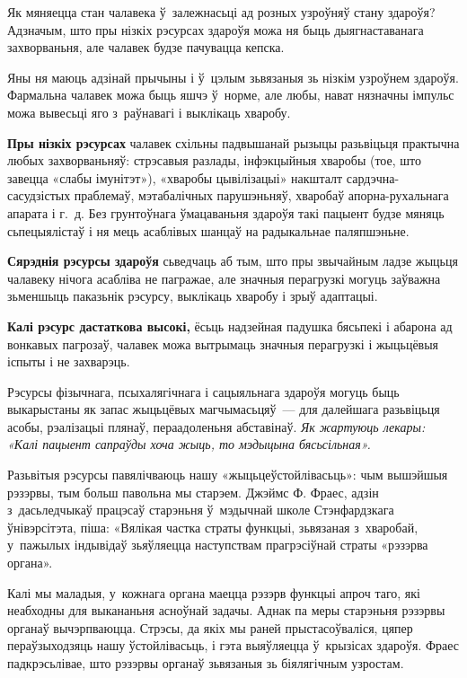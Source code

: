 Як мяняецца стан чалавека ў~залежнасьці ад розных узроўняў стану здароўя? Адзначым, што пры нізкіх рэсурсах здароўя можа ня быць дыягнаставанага захворваньня, але чалавек будзе пачувацца кепска. 


Яны ня маюць адзінай прычыны і ў~цэлым зьвязаныя зь нізкім узроўнем здароўя. Фармальна чалавек можа быць яшчэ ў~норме, але любы, нават нязначны імпульс можа вывесьці яго з~раўнавагі і выклікаць хваробу.

\textbf{Пры нізкіх рэсурсах} чалавек схільны падвышанай рызыцы разьвіцьця практычна любых захворваньняў: стрэсавыя разлады, інфэкцыйныя хваробы (тое, што завецца «слабы імунітэт»), «хваробы цывілізацыі» накшталт сардэчна-сасудзістых праблемаў, мэтабалічных парушэньняў, хваробаў апорна-рухальнага апарата і г.~д. Без грунтоўнага ўмацаваньня здароўя такі пацыент будзе мяняць сьпецыялістаў і ня мець асаблівых шанцаў на радыкальнае паляпшэньне.

\textbf{Сярэднія рэсурсы здароўя} сьведчаць аб тым, што пры звычайным ладзе жыцьця чалавеку нічога асабліва не пагражае, але значныя перагрузкі могуць заўважна зьменшыць паказьнік рэсурсу, выклікаць хваробу і зрыў адаптацыі. 

\textbf{Калі рэсурс дастаткова высокі,} ёсьць надзейная падушка бясьпекі і абарона ад вонкавых пагрозаў, чалавек можа вытрымаць значныя перагрузкі і жыцьцёвыя іспыты і не захварэць.

Рэсурсы фізычнага, псыхалягічнага і сацыяльнага здароўя могуць быць выкарыстаны як запас жыцьцёвых магчымасьцяў~--- для далейшага разьвіцьця асобы, рэалізацыі плянаў, пераадоленьня абставінаў. \emph{Як жартуюць лекары: «Калі пацыент сапраўды хоча жыць, то мэдыцына бясьсільная».}

Разьвітыя рэсурсы павялічваюць нашу «жыцьцеўстойлівасьць»: чым вышэйшыя рэзэрвы, тым больш павольна мы старэем. Джэймс Ф. Фраес, адзін з~дасьледчыкаў працэсаў старэньня ў~мэдычнай школе Стэнфардзкага ўнівэрсітэта, піша: «Вялікая частка страты функцыі, зьвязаная з~хваробай, у~пажылых індывідаў зьяўляецца наступствам прагрэсіўнай страты «рэзэрва органа». 

Калі мы маладыя, у~кожнага органа маецца рэзэрв функцыі апроч таго, які неабходны для выкананьня асноўнай задачы. Аднак па меры старэньня рэзэрвы органаў вычэрпваюцца. Стрэсы, да якіх мы раней прыстасоўваліся, цяпер пераўзыходзяць нашу ўстойлівасьць, і гэта выяўляецца ў~крызісах здароўя. Фраес падкрэсьлівае, што рэзэрвы органаў зьвязаныя зь біялягічным узростам.

